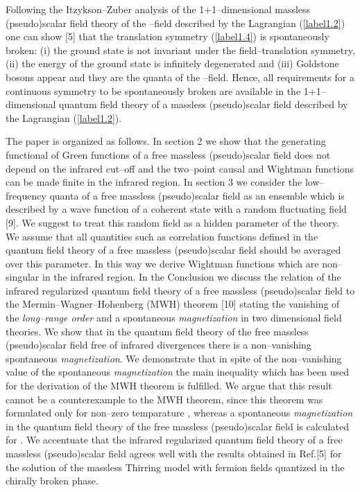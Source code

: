 \documentclass[a4paper,12pt] {article}
\begin{document}
Following the Itzykson--Zuber analysis of the 1+1--dimensional
massless (pseudo)scalar field theory of the \myHighlight{$\vartheta$}\coordHE{}--field
described by the Lagrangian (\ref{label1.2}) one can show [5] that the
translation symmetry (\ref{label1.4}) is spontaneously broken: (i) the
ground state is not invariant under the field--translation symmetry,
(ii) the energy of the ground state is infinitely degenerated and
(iii) Goldstone bosons appear and they are the quanta of the
\myHighlight{$\vartheta$}\coordHE{}--field. Hence, all requirements for a continuous symmetry
to be spontaneously broken are available in the 1+1--dimensional
quantum field theory of a massless (pseudo)scalar field described by
the Lagrangian (\ref{label1.2}).

The paper is organized as follows. In section 2 we show that the
generating functional of Green functions of a free massless
(pseudo)scalar field \coordHE{} does not depend on the infrared
cut--off and the two--point causal and Wightman functions can be made
finite in the infrared region. In section 3 we consider the
low--frequency quanta of a free massless (pseudo)scalar field as an
ensemble which is described by a wave function of a coherent state
with a random fluctuating field \coordHE{} [9]. We suggest to treat
this random field as a hidden parameter of the theory. We assume that
all quantities such as correlation functions defined in the quantum
field theory of a free massless (pseudo)scalar field \coordHE{}
should be averaged over this parameter. In this way we derive Wightman
functions which are non--singular in the infrared region. In the
Conclusion we discuss the relation of the infrared regularized quantum
field theory of a free massless (pseudo)scalar field \coordHE{} to
the Mermin--Wagner--Hohenberg (MWH) theorem [10] stating the vanishing
of the {\it long--range order} and a spontaneous {\it magnetization}
in two dimensional field theories. We show that in the quantum field
theory of the free massless (pseudo)scalar field free of infrared
divergences there is a non--vanishing spontaneous {\it magnetization}.
We demonstrate that in spite of the non--vanishing value of the
spontaneous {\it magnetization} the main inequality which has been
used for the derivation of the MWH theorem is fulfilled. We argue that
this result cannot be a counterexample to the MWH theorem, since this
theorem was formulated only for non--zero temparature \coordHE{},
whereas a spontaneous {\it magnetization} in the quantum field theory
of the free massless (pseudo)scalar field is calculated for \coordHE{}. We
accentuate that the infrared regularized quantum field theory of a
free massless (pseudo)scalar field \coordHE{} agrees well with the
results obtained in Ref.[5] for the solution of the massless Thirring
model with fermion fields quantized in the chirally broken phase.
\end{document}
